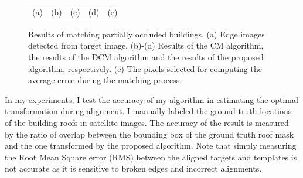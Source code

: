 \documentclass{iitthesis}
\begin{document}
\begin{figure}
{\begin{tabular}{ccccc}
  \\
  (a) & (b) & (c) & (d) & (e)
\end{tabular}}
\caption{Results of matching partially occluded buildings. (a) Edge images detected from target image. (b)-(d) Results of the CM algorithm, the results of the DCM algorithm and the results of the proposed algorithm, respectively. (e) The pixels selected for computing the average error during the matching process.}
\label{fig: incomplete building results}
\end{figure} 


In my experiments, I test the accuracy of my algorithm in estimating the optimal transformation during alignment. I manually labeled the ground truth locations of the building roofs in satellite images. The accuracy of the result is measured by the ratio of overlap between the bounding box of the ground truth roof mask and the one transformed by the proposed algorithm. Note that simply measuring the Root Mean Square error (RMS) between the aligned targets and templates is not accurate as it is sensitive to broken edges and incorrect alignments.
\end{document}

